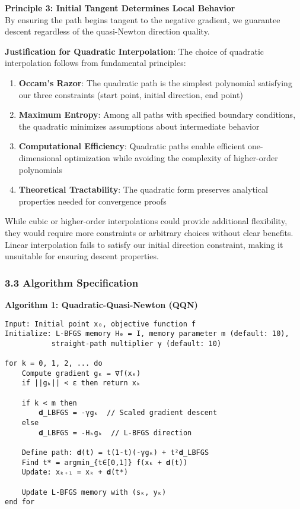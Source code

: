 \textbf{Principle 3: Initial Tangent Determines Local Behavior}\\
By ensuring the path begins tangent to the negative gradient, we guarantee descent regardless of the quasi-Newton direction quality.

\textbf{Justification for Quadratic Interpolation}: The choice of quadratic interpolation follows from fundamental
principles:

\begin{enumerate}
\def\labelenumi{\arabic{enumi}.}
\tightlist
\item
  \textbf{Occam's Razor}: The quadratic path is the simplest polynomial satisfying our three constraints (start point,
  initial direction, end point)
\item
  \textbf{Maximum Entropy}: Among all paths with specified boundary conditions, the quadratic minimizes assumptions about
  intermediate behavior
\item
  \textbf{Computational Efficiency}: Quadratic paths enable efficient one-dimensional optimization while avoiding the
  complexity of higher-order polynomials
\item
  \textbf{Theoretical Tractability}: The quadratic form preserves analytical properties needed for convergence proofs
\end{enumerate}

While cubic or higher-order interpolations could provide additional flexibility, they would require more constraints or
arbitrary choices without clear benefits. Linear interpolation fails to satisfy our initial direction constraint, making
it unsuitable for ensuring descent properties.

\hypertarget{algorithm-specification}{%
\subsubsection{3.3 Algorithm Specification}\label{algorithm-specification}}

\textbf{Algorithm 1: Quadratic-Quasi-Newton (QQN)}

\begin{verbatim}
Input: Initial point x₀, objective function f
Initialize: L-BFGS memory H₀ = I, memory parameter m (default: 10),
           straight-path multiplier γ (default: 10)

for k = 0, 1, 2, ... do
    Compute gradient gₖ = ∇f(xₖ)
    if ||gₖ|| < ε then return xₖ

    if k < m then
        𝐝_LBFGS = -γgₖ  // Scaled gradient descent
    else
        𝐝_LBFGS = -Hₖgₖ  // L-BFGS direction

    Define path: 𝐝(t) = t(1-t)(-γgₖ) + t²𝐝_LBFGS
    Find t* = argmin_{t∈[0,1]} f(xₖ + 𝐝(t))
    Update: xₖ₊₁ = xₖ + 𝐝(t*)

    Update L-BFGS memory with (sₖ, yₖ)
end for
\end{verbatim}

